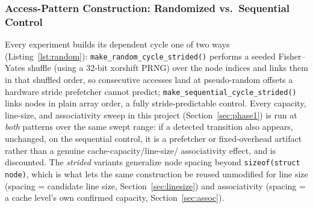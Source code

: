 \documentclass{article}
\begin{document}
\subsubsection{Access-Pattern Construction: Randomized vs.\ Sequential Control}

Every experiment builds its dependent cycle one of two ways (Listing~\ref{lst:random}):
\texttt{make\_random\_cycle\_strided()} performs a seeded Fisher--Yates shuffle (using a
32-bit xorshift PRNG) over the node indices and links them in that shuffled order, so
consecutive accesses land at pseudo-random offsets a hardware stride prefetcher cannot
predict; \texttt{make\_sequential\_cycle\_strided()} links nodes in plain array order, a
fully stride-predictable control. Every capacity, line-size, and associativity sweep in
this project (Section~\ref{sec:phase1}) is run at \emph{both} patterns over the same swept
range: if a detected transition also appears, unchanged, on the sequential control, it is
a prefetcher or fixed-overhead artifact rather than a genuine cache-capacity/line-size/
associativity effect, and is discounted. The \emph{strided} variants generalize node
spacing beyond \texttt{sizeof(struct node)}, which is what lets the same construction be
reused unmodified for line size (spacing = candidate line size, Section~\ref{sec:linesize})
and associativity (spacing = a cache level's own confirmed capacity,
Section~\ref{sec:assoc}).
\end{document}

